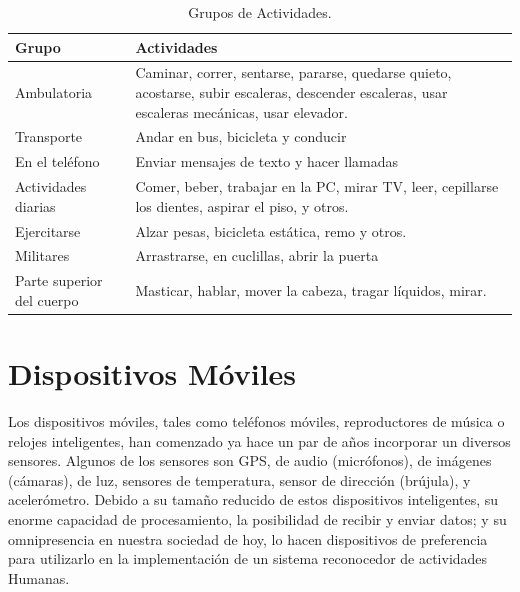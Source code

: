 \begin{table}[htbp]
	\begin{center}
		\begin{tabular}{|l|p{9cm}|}
			\hline
			\textbf{Grupo} & \textbf{Actividades} \\
			\hline \hline
			Ambulatoria & Caminar, correr, sentarse, pararse, quedarse quieto, acostarse, subir escaleras, descender escaleras, usar escaleras mecánicas, usar elevador.\\ \hline
			Transporte & Andar en bus, bicicleta y conducir \\ \hline
			En el teléfono & Enviar mensajes de texto y hacer llamadas \\ \hline
			Actividades diarias & Comer, beber, trabajar en la PC, mirar TV, leer, cepillarse los dientes, aspirar el piso, y otros. \\ \hline
			Ejercitarse & Alzar pesas, bicicleta estática, remo y otros. \\ \hline
			Militares & Arrastrarse, en cuclillas, abrir la puerta \\ \hline
			Parte superior del cuerpo & Masticar, hablar, mover la cabeza, tragar líquidos, mirar. \\ \hline
		\end{tabular}
		\caption{Grupos de Actividades.}
		\label{tabla:sencilla}
	\end{center}
\end{table}


\section{Dispositivos Móviles}
\label{sec23:dispositivos-moviles}
Los dispositivos móviles, tales como teléfonos móviles, reproductores de música o relojes inteligentes, han comenzado ya hace un par de años incorporar un diversos sensores. Algunos de los sensores son GPS, de audio (micrófonos), de imágenes (cámaras), de luz, sensores de temperatura, sensor de dirección (brújula), y acelerómetro.
Debido a su tamaño reducido de estos dispositivos inteligentes, su enorme capacidad de procesamiento, la posibilidad de recibir y enviar datos; y su omnipresencia en nuestra sociedad de hoy, lo hacen dispositivos de preferencia para utilizarlo en la implementación de un sistema reconocedor de actividades Humanas.

